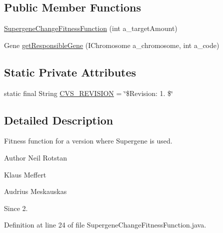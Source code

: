 \subsection*{Public Member Functions}
\begin{DoxyCompactItemize}
\item 
\hyperlink{classexamples_1_1supergene_1_1_supergene_change_fitness_function_aaae5a254f81a00a1a4c5d13c03026dc0}{Supergene\-Change\-Fitness\-Function} (int a\-\_\-target\-Amount)
\item 
Gene \hyperlink{classexamples_1_1supergene_1_1_supergene_change_fitness_function_a3bcce668e64e997376557e371de33717}{get\-Responsible\-Gene} (I\-Chromosome a\-\_\-chromosome, int a\-\_\-code)
\end{DoxyCompactItemize}
\subsection*{Static Private Attributes}
\begin{DoxyCompactItemize}
\item 
static final String \hyperlink{classexamples_1_1supergene_1_1_supergene_change_fitness_function_a0353fac3c56a6b9cd7665a85ed693f64}{C\-V\-S\-\_\-\-R\-E\-V\-I\-S\-I\-O\-N} = \char`\"{}\$Revision\-: 1. \$\char`\"{}
\end{DoxyCompactItemize}


\subsection{Detailed Description}
Fitness function for a version where Supergene is used.

\begin{DoxyAuthor}{Author}
Neil Rotstan 

Klaus Meffert 

Audrius Meskauskas 
\end{DoxyAuthor}
\begin{DoxySince}{Since}
2. 
\end{DoxySince}


Definition at line 24 of file Supergene\-Change\-Fitness\-Function.\-java.



